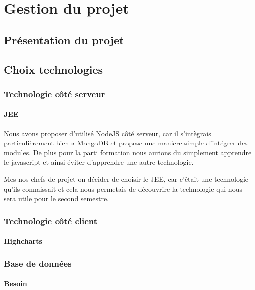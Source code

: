 \chapter{Gestion du projet}

\section{Présentation du projet}



\section{Choix technologies}

\subsection{Technologie côté serveur}

\subsubsection{JEE}

Nous avons proposer d'utilisé NodeJS côté serveur, car il s'intègrais particulièrement 
bien a MongoDB et propose une maniere simple d'intégrer des modules. De plus pour la 
parti formation nous aurions du simplement apprendre le javascript et ainsi éviter 
d'apprendre une autre technologie.

Mes nos chefs de projet on décider de choisir le JEE, car c'êtait une technologie 
qu'ils connaissait et cela nous permetais de découvrire la technologie qui nous sera 
utile pour le second semestre.

\subsection{Technologie côté client}


\subsubsection{Highcharts}



\subsection{Base de données}

\subsubsection{Besoin}

